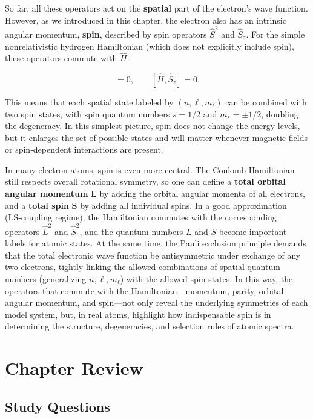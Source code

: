 \documentclass[
  english,
  9pt,
]{extbook}
\theoremstyle{definition}
\theoremstyle{definition}
\theoremstyle{definition}
\theoremstyle{definition}
\theoremstyle{remark}
\begin{document}
So far, all these operators act on the \textbf{spatial} part of the electron's wave function. However, as we introduced in this chapter, the electron also has an intrinsic angular momentum, \textbf{spin}, described by spin operators \(\hat{S}^2\) and \(\hat{S}_z\). For the simple nonrelativistic hydrogen Hamiltonian (which does not explicitly include spin), these operators commute with \(\hat{H}\):

\begin{equation}
[\hat{H}, \hat{S}^2] = 0, \qquad [\hat{H}, \hat{S}_z] = 0.
\label{eq:spop17} 
\end{equation}

This means that each spatial state labeled by \((n, \ell, m_\ell)\) can be combined with two spin states, with spin quantum numbers \(s = 1/2\) and \(m_s = \pm 1/2\), doubling the degeneracy. In this simplest picture, spin does not change the energy levels, but it enlarges the set of possible states and will matter whenever magnetic fields or spin‑dependent interactions are present.

In many‑electron atoms, spin is even more central. The Coulomb Hamiltonian still respects overall rotational symmetry, so one can define a \textbf{total orbital angular momentum} \(\mathbf{L}\) by adding the orbital angular momenta of all electrons, and a \textbf{total spin} \(\mathbf{S}\) by adding all individual spins. In a good approximation (LS‑coupling regime), the Hamiltonian commutes with the corresponding operators \(\hat{L}^2\) and \(\hat{S}^2\), and the quantum numbers \(L\) and \(S\) become important labels for atomic states. At the same time, the Pauli exclusion principle demands that the total electronic wave function be antisymmetric under exchange of any two electrons, tightly linking the allowed combinations of spatial quantum numbers (generalizing \(n, \ell, m_\ell\)) with the allowed spin states. In this way, the operators that commute with the Hamiltonian---momentum, parity, orbital angular momentum, and spin---not only reveal the underlying symmetries of each model system, but, in real atoms, highlight how indispensable spin is in determining the structure, degeneracies, and selection rules of atomic spectra.

\section{Chapter Review}\label{rev7}

\subsection{Study Questions}\label{quest7}
\end{document}
